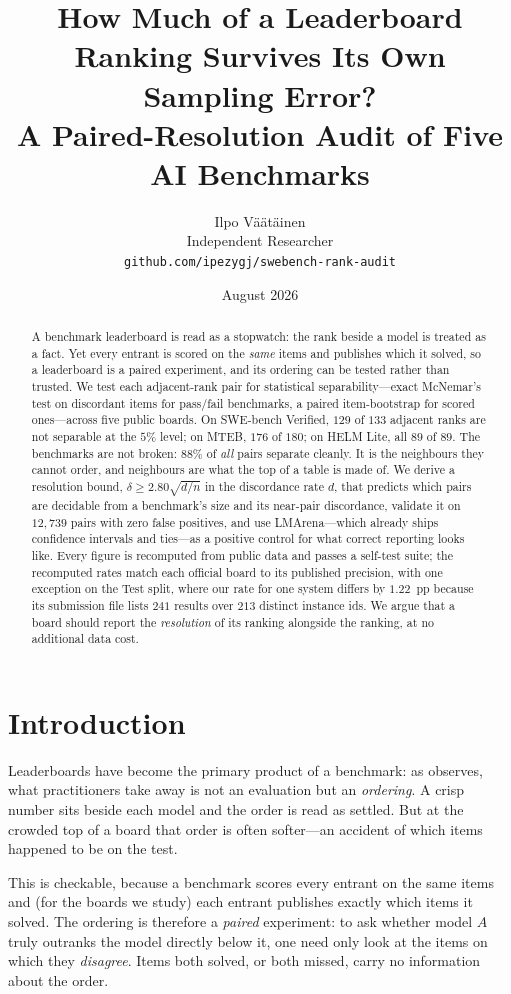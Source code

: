 \documentclass[11pt]{article}
\title{\bfseries How Much of a Leaderboard Ranking Survives Its Own Sampling Error?\\
\large A Paired-Resolution Audit of Five AI Benchmarks}
\author{Ilpo V\"a\"at\"ainen\\
\small Independent Researcher\\
\small \texttt{github.com/ipezygj/swebench-rank-audit}}
\date{August 2026}
\begin{document}
\maketitle

\begin{abstract}
A benchmark leaderboard is read as a stopwatch: the rank beside a model is treated as a fact.
Yet every entrant is scored on the \emph{same} items and publishes which it solved, so a
leaderboard is a paired experiment, and its ordering can be tested rather than trusted. We test
each adjacent-rank pair for statistical separability---exact McNemar's test on discordant items for
pass/fail benchmarks, a paired item-bootstrap for scored ones---across five public boards.
On SWE-bench Verified, $129$ of $133$ adjacent ranks are not separable at the $5\%$ level; on MTEB,
$176$ of $180$; on HELM Lite, all $89$ of $89$. The benchmarks are not broken: $88\%$ of \emph{all}
pairs separate cleanly. It is the neighbours they cannot order, and neighbours are what the top of a
table is made of. We derive a resolution bound, $\delta \ge 2.80\sqrt{d/n}$ in the discordance rate
$d$, that predicts which pairs are decidable from a benchmark's size and its near-pair discordance,
validate it on $12{,}739$ pairs
with zero false positives, and use LMArena---which already ships confidence intervals and ties---as a
positive control for what correct reporting looks like. Every figure is recomputed from public data
and passes a self-test suite; the recomputed rates match each official board to its published
precision, with one exception on the Test split, where our rate for one system differs by $1.22$~pp
because its submission file lists $241$ results over $213$ distinct instance ids. We argue that a
board should report the \emph{resolution} of its ranking alongside the ranking, at no additional data
cost.
\end{abstract}

\section{Introduction}
Leaderboards have become the primary product of a benchmark: as \citet{hardt2025} observes, what
practitioners take away is not an evaluation but an \emph{ordering}. A crisp number sits beside each
model and the order is read as settled. But at the crowded top of a board that order is often
softer---an accident of which items happened to be on the test.

This is checkable, because a benchmark scores every entrant on the same items and (for the boards we
study) each entrant publishes exactly which items it solved. The ordering is therefore a
\emph{paired} experiment: to ask whether model $A$ truly outranks the model directly below it, one
need only look at the items on which they \emph{disagree}. Items both solved, or both missed, carry
no information about the order.
\end{document}
